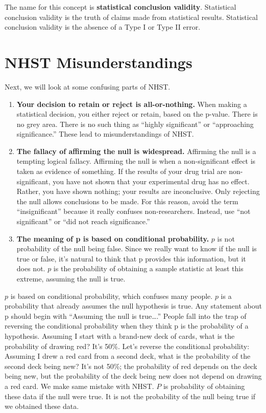 \documentclass[
]{book}
\begin{document}
The name for this concept is \textbf{statistical conclusion validity}. Statistical conclusion validity is the truth of claims made from statistical results. Statistical conclusion validity is the absence of a Type I or Type II error.

\hypertarget{nhst-misunderstandings}{%
\section{NHST Misunderstandings}\label{nhst-misunderstandings}}

Next, we will look at some confusing parts of NHST.

\begin{enumerate}
\def\labelenumi{\arabic{enumi}.}
\item
  \textbf{Your decision to retain or reject is all-or-nothing.} When making a statistical decision, you either reject or retain, based on the p-value. There is no grey area. There is no such thing as ``highly significant'' or ``approaching significance.'' These lead to misunderstandings of NHST.
\item
  \textbf{The fallacy of affirming the null is widespread.} Affirming the null is a tempting logical fallacy. Affirming the null is when a non-significant effect is taken as evidence of something. If the results of your drug trial are non-significant, you have not shown that your experimental drug has no effect. Rather, you have shown nothing; your results are inconclusive. Only rejecting the null allows conclusions to be made. For this reason, avoid the term ``insignificant'' because it really confuses non-researchers. Instead, use ``not significant'' or ``did not reach significance.''
\item
  \textbf{The meaning of p is based on conditional probability.} \(p\) is not probability of the null being false. Since we really want to know if the null is true or false, it's natural to think that p provides this information, but it does not. \(p\) is the probability of obtaining a sample statistic at least this extreme, assuming the null is true.
\end{enumerate}

\(p\) is based on conditional probability, which confuses many people. \(p\) is a probability that already assumes the null hypothesis is true. Any statement about p should begin with ``Assuming the null is true\ldots.'' People fall into the trap of reversing the conditional probability when they think p is the probability of a hypothesis. Assuming I start with a brand-new deck of cards, what is the probability of drawing red? It's 50\%. Let's reverse the conditional probability: Assuming I drew a red card from a second deck, what is the probability of the second deck being new? It's not 50\%; the probability of red depends on the deck being new, but the probability of the deck being new does not depend on drawing a red card. We make same mistake with NHST. \(P\) is probability of obtaining these data if the null were true. It is not the probability of the null being true if we obtained these data.
\end{document}

